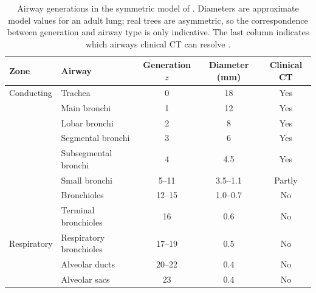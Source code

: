 \begin{table}[htbp]                      %
  \centering                             %
  \small                                 %
  \caption{Airway generations in the symmetric model of \citet{weibel1963}. Diameters are
           approximate model values for an adult lung; real trees are asymmetric, so the
           correspondence between generation and airway type is only indicative. The last
           column indicates which airways clinical CT can resolve
           \cite{burgel2013small}.}
  \label{tab:weibel_generations}         %
  \begin{tabular}{llccc}                 %
    \toprule
    Zone & Airway & Generation $z$ & Diameter (mm) & Clinical CT \\
    \midrule
    Conducting  & Trachea                & 0       & 18        & Yes \\
                & Main bronchi           & 1       & 12        & Yes \\
                & Lobar bronchi          & 2       & 8         & Yes \\
                & Segmental bronchi      & 3       & 6         & Yes \\
                & Subsegmental bronchi   & 4       & 4.5       & Yes \\
                & Small bronchi          & 5--11   & 3.5--1.1  & Partly \\
                & Bronchioles            & 12--15  & 1.0--0.7  & No \\
                & Terminal bronchioles   & 16      & 0.6       & No \\
    \midrule
    Respiratory & Respiratory bronchioles & 17--19 & 0.5       & No \\
                & Alveolar ducts         & 20--22  & 0.4       & No \\
                & Alveolar sacs          & 23      & 0.4       & No \\
    \bottomrule
  \end{tabular}
\end{table}

